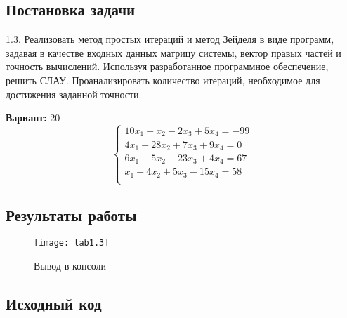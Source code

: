 \subsection{Постановка задачи}
1.3. Реализовать метод простых итераций и метод Зейделя в виде программ, задавая в качестве входных данных матрицу системы, вектор правых частей и точность вычислений. Используя разработанное программное обеспечение, решить СЛАУ. Проанализировать количество итераций, необходимое для достижения заданной точности.

{\bfseries Вариант:} 20
\begin{equation}
        \left\{ 
        \begin{array}{ll} 
        10x_1 - x_2 - 2x_3 + 5x_4 = -99 \\
        4x_1 + 28x_2 + 7x_3 + 9x_4 = 0\\
        6x_1 + 5x_2 - 23x_3 + 4x_4 = 67\\
        x_1 + 4x_2 + 5x_3 - 15x_4 = 58\\
        \end{array}\right.
\end{equation}
\pagebreak

\subsection{Результаты работы}

\begin{figure}[h!]
\centering
\texttt{[image: lab1.3]}
\caption{Вывод в консоли}
\end{figure}
\pagebreak

\vfill

\subsection{Исходный код}


\pagebreak